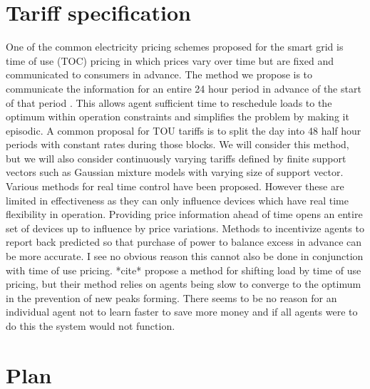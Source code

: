 \documentclass[11pt]{article}
\begin{document}

\section{Tariff specification}
One of the common electricity pricing schemes proposed for the smart grid is
time of use (TOC) pricing in which prices vary over time but are fixed and
communicated to consumers in advance. The method we propose is to communicate the information for an entire 24 hour period in advance of the start
of that period . This allows agent sufficient time to reschedule loads to the
optimum within operation constraints and simplifies the problem by making it
episodic.
A common proposal for TOU tariffs is to split the day into 48 half hour
periods with constant rates during those blocks. We will consider this method,
but we will also consider continuously varying tariffs defined by finite support
vectors such as Gaussian mixture models with varying size of support vector.
Various methods for real time control have been proposed. However these
are limited in effectiveness as they can only influence devices which have real
time flexibility in operation. Providing price information ahead of time opens an
entire set of devices up to influence by price variations. Methods to incentivize
agents to report back predicted so that purchase of power to balance excess in
advance can be more accurate. I see no obvious reason this cannot also be done
in conjunction with time of use pricing. *cite* propose a method for shifting
load by time of use pricing, but their method relies on agents being slow to
converge to the optimum in the prevention of new peaks forming. There seems
to be no reason for an individual agent not to learn faster to save more money
and if all agents were to do this the system would not function.


\section{Plan}
\end{document}
